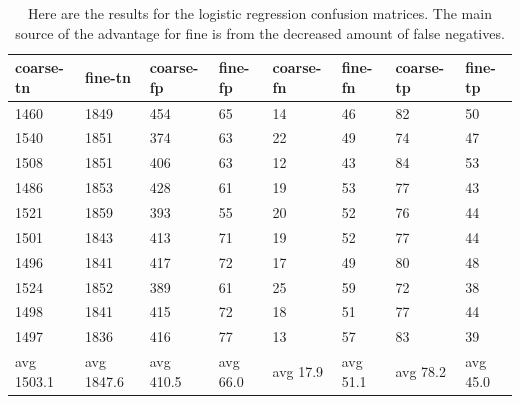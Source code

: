 \documentclass[ms]{nuthesis}
\begin{document}
\FloatBarrier
\begin{table}[h]
  \centering
  \begin{tabular}{|l||l||l||l||l||l||l||l|}\toprule
    coarse-tn & fine-tn & coarse-fp & fine-fp & coarse-fn & fine-fn & coarse-tp & fine-tp \\ \midrule
    1460 & 1849 & 454 & 65 & 14 & 46 & 82 & 50 \\
    1540 & 1851 & 374 & 63 & 22 & 49 & 74 & 47 \\
    1508 & 1851 & 406 & 63 & 12 & 43 & 84 & 53 \\
    1486 & 1853 & 428 & 61 & 19 & 53 & 77 & 43 \\
    1521 & 1859 & 393 & 55 & 20 & 52 & 76 & 44 \\
    1501 & 1843 & 413 & 71 & 19 & 52 & 77 & 44 \\
    1496 & 1841 & 417 & 72 & 17 & 49 & 80 & 48 \\
    1524 & 1852 & 389 & 61 & 25 & 59 & 72 & 38 \\
    1498 & 1841 & 415 & 72 & 18 & 51 & 77 & 44 \\
    1497 & 1836 & 416 & 77 & 13 & 57 & 83 & 39 \\
    avg 1503.1 & avg 1847.6 & avg 410.5 & avg 66.0 & avg 17.9 & avg 51.1 & avg 78.2 & avg 45.0 \\ \bottomrule
  \end{tabular}
  \caption{Here are the results for the logistic regression confusion matrices. The main source of the advantage
  for fine is from the decreased amount of false negatives.}
  \label{tab:logReg}
\end{table}
\FloatBarrier
\end{document}

